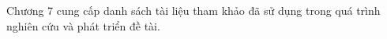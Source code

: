 \documentclass[../DoAn.tex]{subfiles}
\begin{document}
Chương 7 cung cấp danh sách tài liệu tham khảo đã sử dụng trong quá trình nghiên cứu và phát triển đề tài.






\end{document}
